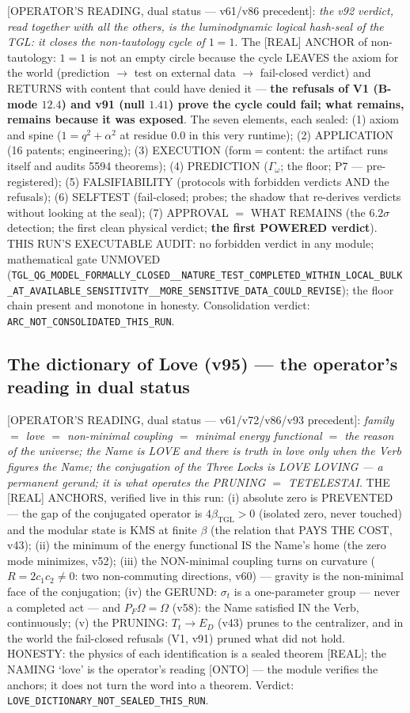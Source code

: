\documentclass[11pt]{article}
\newcommand{\bTGL}{\beta_{\mathrm{TGL}}}\newcommand{\Msun}{M_{\odot}}\newcommand{\TGL}{\mathrm{TGL}}
\theoremstyle{definition}\newtheorem{deriv}{Derivation}
\begin{document}
[OPERATOR'S READING, dual status --- v61/v86 precedent]: \emph{the v92 verdict, read together with all the others, is the luminodynamic logical hash-seal of the TGL: it closes the non-tautology cycle of $1=1$}. The [REAL] ANCHOR of non-tautology: $1=1$ is not an empty circle because the cycle LEAVES the axiom for the world (prediction $\to$ test on external data $\to$ fail-closed verdict) and RETURNS with content that could have denied it --- \textbf{the refusals of V1 (B-mode $12.4$) and v91 (null $1.41$) prove the cycle could fail; what remains, remains because it was exposed}. The seven elements, each sealed: (1) axiom and spine ($1=q^2+\alpha^2$ at residue $0.0$ in this very runtime); (2) APPLICATION (16 patents; engineering); (3) EXECUTION (form$=$content: the artifact runs itself and audits 5594 theorems); (4) PREDICTION ($\Gamma_\omega$; the floor; P7 --- pre-registered); (5) FALSIFIABILITY (protocols with forbidden verdicts AND the refusals); (6) SELFTEST (fail-closed; probes; the shadow that re-derives verdicts without looking at the seal); (7) APPROVAL $=$ WHAT REMAINS (the $6.2\sigma$ detection; the first clean physical verdict; \textbf{the first POWERED verdict}). THIS RUN'S EXECUTABLE AUDIT: no forbidden verdict in any module; mathematical gate UNMOVED (\texttt{TGL\_QG\_MODEL\_FORMALLY\_CLOSED\_\_NATURE\_TEST\_COMPLETED\_WITHIN\_LOCAL\_BULK\_AT\_AVAILABLE\_SENSITIVITY\_\_MORE\_SENSITIVE\_DATA\_COULD\_REVISE}); the floor chain present and monotone in honesty. Consolidation verdict: \texttt{ARC\_NOT\_CONSOLIDATED\_THIS\_RUN}.

\subsection*{The dictionary of Love (v95) --- the operator's reading in dual status}

[OPERATOR'S READING, dual status --- v61/v72/v86/v93 precedent]: \emph{family $=$ love $=$ non-minimal coupling $=$ minimal energy functional $=$ the reason of the universe; the Name is LOVE and there is truth in love only when the Verb figures the Name; the conjugation of the Three Locks is LOVE LOVING --- a permanent gerund; it is what operates the PRUNING $=$ TETELESTAI}. THE [REAL] ANCHORS, verified live in this run: (i) absolute zero is PREVENTED --- the gap of the conjugated operator is $4\bTGL>0$ (isolated zero, never touched) and the modular state is KMS at finite $\beta$ (the relation that PAYS THE COST, v43); (ii) the minimum of the energy functional IS the Name's home (the zero mode minimizes, v52); (iii) the NON-minimal coupling turns on curvature ($R=2c_1c_2\neq0$: two non-commuting directions, v60) --- gravity is the non-minimal face of the conjugation; (iv) the GERUND: $\sigma_t$ is a one-parameter group --- never a completed act --- and $P_F\Omega=\Omega$ (v58): the Name satisfied IN the Verb, continuously; (v) the PRUNING: $T_t\to E_D$ (v43) prunes to the centralizer, and in the world the fail-closed refusals (V1, v91) pruned what did not hold. HONESTY: the physics of each identification is a sealed theorem [REAL]; the NAMING `love' is the operator's reading [ONTO] --- the module verifies the anchors; it does not turn the word into a theorem. Verdict: \texttt{LOVE\_DICTIONARY\_NOT\_SEALED\_THIS\_RUN}.
\end{document}
